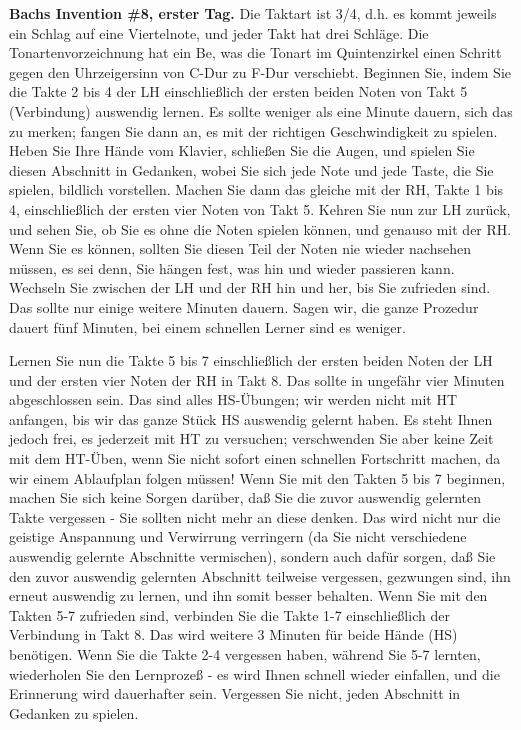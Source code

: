 
\hypertarget{c1iii6l2}{}

\textbf{Bachs Invention \#8, erster Tag.}
Die Taktart ist 3/4, d.h. es kommt jeweils ein Schlag auf eine Viertelnote, und jeder Takt hat drei Schläge.
Die Tonartenvorzeichnung hat ein Be, was die Tonart im Quintenzirkel einen Schritt gegen den Uhrzeigersinn von C-Dur zu F-Dur verschiebt.
Beginnen Sie, indem Sie die Takte 2 bis 4 der LH einschließlich der ersten beiden Noten von Takt 5 (Verbindung) auswendig lernen.
Es sollte weniger als eine Minute dauern, sich das zu merken; fangen Sie dann an, es mit der richtigen Geschwindigkeit zu spielen.
Heben Sie Ihre Hände vom Klavier, schließen Sie die Augen, und spielen Sie diesen Abschnitt in Gedanken, wobei Sie sich jede Note und jede Taste, die Sie spielen, bildlich vorstellen.
Machen Sie dann das gleiche mit der RH, Takte 1 bis 4, einschließlich der ersten vier Noten von Takt 5.
Kehren Sie nun zur LH zurück, und sehen Sie, ob Sie es ohne die Noten spielen können, und genauso mit der RH.
Wenn Sie es können, sollten Sie diesen Teil der Noten nie wieder nachsehen müssen, es sei denn, Sie hängen fest, was hin und wieder passieren kann.
Wechseln Sie zwischen der LH und der RH hin und her, bis Sie zufrieden sind.
Das sollte nur einige weitere Minuten dauern.
Sagen wir, die ganze Prozedur dauert fünf Minuten, bei einem schnellen Lerner sind es weniger.

Lernen Sie nun die Takte 5 bis 7 einschließlich der ersten beiden Noten der LH und der ersten vier Noten der RH in Takt 8.
Das sollte in ungefähr vier Minuten abgeschlossen sein.
Das sind alles HS-Übungen; wir werden nicht mit HT anfangen, bis wir das ganze Stück HS auswendig gelernt haben.
Es steht Ihnen jedoch frei, es jederzeit mit HT zu versuchen; verschwenden Sie aber keine Zeit mit dem HT-Üben, wenn Sie nicht sofort einen schnellen Fortschritt machen, da wir einem Ablaufplan folgen müssen!
Wenn Sie mit den Takten 5 bis 7 beginnen, machen Sie sich keine Sorgen darüber, daß Sie die zuvor auswendig gelernten Takte vergessen - Sie sollten nicht mehr an diese denken.
Das wird nicht nur die geistige Anspannung und Verwirrung verringern (da Sie nicht verschiedene auswendig gelernte Abschnitte vermischen), sondern auch dafür sorgen, daß Sie den zuvor auswendig gelernten Abschnitt teilweise vergessen, gezwungen sind, ihn erneut auswendig zu lernen, und ihn somit besser behalten.
Wenn Sie mit den Takten 5-7 zufrieden sind, verbinden Sie die Takte 1-7 einschließlich der Verbindung in Takt 8.
Das wird weitere 3 Minuten für beide Hände (HS) benötigen.
Wenn Sie die Takte 2-4 vergessen haben, während Sie 5-7 lernten, wiederholen Sie den Lernprozeß - es wird Ihnen schnell wieder einfallen, und die Erinnerung wird dauerhafter sein.
Vergessen Sie nicht, jeden Abschnitt in Gedanken zu spielen.

